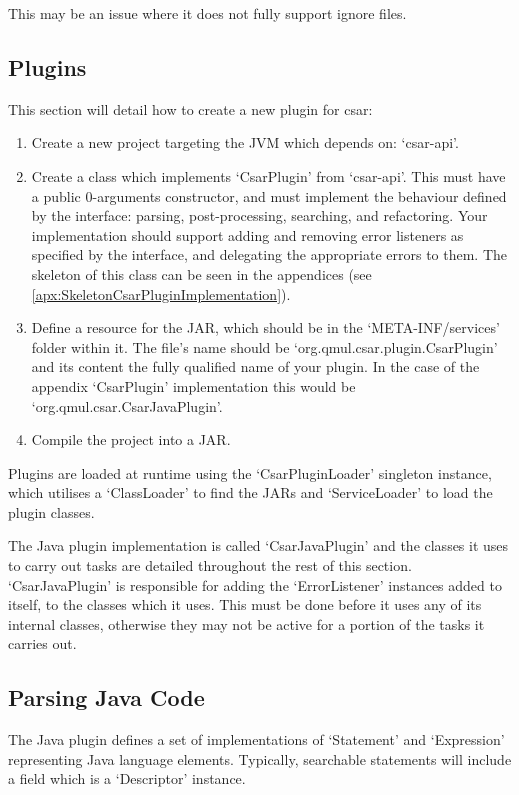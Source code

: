 \documentclass[12pt, letterpaper]{article}
\begin{document}
This may be an issue where it does not fully support ignore files.

\subsection{Plugins}
This section will detail how to create a new plugin for csar:
\begin{enumerate}
  \item Create a new project targeting the JVM which depends on: `csar-api'.
  \item Create a class which implements `CsarPlugin' from `csar-api'.
  This must have a public 0-arguments constructor, and must implement the behaviour defined by the interface: parsing, post-processing, searching, and refactoring.
  Your implementation should support adding and removing error listeners as specified by the interface, and delegating the appropriate errors to them.
  The skeleton of this class can be seen in the appendices (see \ref{apx:SkeletonCsarPluginImplementation}).
  \item Define a resource for the JAR, which should be in the `META-INF/services' folder within it.
  The file's name should be `org.qmul.csar.plugin.CsarPlugin' and its content the fully qualified name of your plugin.
  In the case of the appendix `CsarPlugin' implementation this would be `org.qmul.csar.CsarJavaPlugin'.
  \item Compile the project into a JAR.
\end{enumerate}

Plugins are loaded at runtime using the `CsarPluginLoader' singleton instance, which utilises a `ClassLoader' to find the JARs and `ServiceLoader' to load the plugin classes.

The Java plugin implementation is called `CsarJavaPlugin' and the classes it uses to carry out tasks are detailed throughout the rest of this section.
`CsarJavaPlugin' is responsible for adding the `ErrorListener' instances added to itself, to the classes which it uses.
This must be done before it uses any of its internal classes, otherwise they may not be active for a portion of the tasks it carries out.

\subsection{Parsing Java Code}
The Java plugin defines a set of implementations of `Statement' and `Expression' representing Java language elements.
Typically, searchable statements will include a field which is a `Descriptor' instance.
\end{document}
